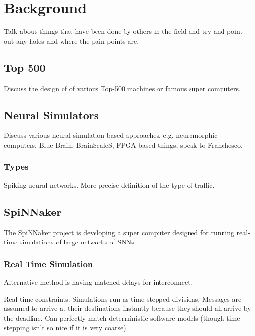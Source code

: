 \chapter{Background}
	\label{chap:background}
	
	Talk about things that have been done by others in the field and try and point
	out any holes and where the pain points are.
	
	\section{Top 500}
		
		Discuss the design of of various Top-500 machines or famous super computers.
	
	\section{Neural Simulators}
		
		Discuss various neural-simulation based approaches, e.g. neuromorphic
		computers, Blue Brain, BrainScaleS, FPGA based things, speak to Franchesco.
		
		\subsection{Types}
			
			Spiking neural networks. More precise definition of the type of traffic.
	
	\section{SpiNNaker}
		
		
		The SpiNNaker project is developing a super computer designed for running
		real-time simulations of large networks of SNNs.
		
		\subsection{Real Time Simulation}
			
			Alternative method is having matched delays for interconnect.
			
			Real time constraints. Simulations run as time-stepped divisions. Messages
			are assumed to arrive at their destinations instantly because they should
			all arrive by the deadline. Can perfectly match deterministic software
			models (though time stepping isn't so nice if it is very coarse).
		
